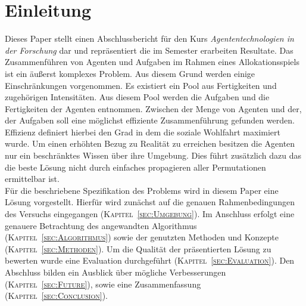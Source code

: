 \documentclass[fleqn,10pt]{SelfArx} %
\newcommand{\ChapterCite}[1]{\textsc{Kapitel~\ref{#1}}}
\begin{document}
\flushbottom %

\maketitle %

\tableofcontents %

\thispagestyle{empty} %


\section*{Einleitung} %
\label{sec:einleitung}


Dieses Paper stellt einen Abschlussbericht für den Kurs \textit{Agententechnologien in der Forschung} dar und repräsentiert die im Semester erarbeiten Resultate. Das Zusammenführen von Agenten und Aufgaben im Rahmen eines Allokationsspiels ist ein äußerst komplexes Problem. Aus diesem Grund werden einige Einschränkungen vorgenommen. Es existiert ein Pool aus Fertigkeiten und zugehörigen Intensitäten. Aus diesem Pool werden die Aufgaben und die Fertigkeiten der Agenten entnommen. Zwischen der Menge von Agenten und der, der Aufgaben soll eine möglichst effiziente Zusammenführung gefunden werden. Effizienz definiert hierbei den Grad in dem die soziale Wohlfahrt maximiert wurde. Um einen erhöhten Bezug zu Realität zu erreichen besitzen die Agenten nur ein beschränktes Wissen über ihre Umgebung. Dies führt zusätzlich dazu das die beste Lösung nicht durch einfaches propagieren aller Permutationen ermittelbar ist. \\
Für die beschriebene Spezifikation des Problems wird in diesem Paper eine Lösung vorgestellt. Hierfür wird zunächst auf die genauen Rahmenbedingungen des Versuchs eingegangen (\ChapterCite{sec:Umgebung}). Im Anschluss erfolgt eine genauere Betrachtung des angewandten Algorithmus (\ChapterCite{sec:Algorithmus}) sowie der genutzten Methoden und Konzepte (\ChapterCite{sec:Methoden}). Um die Qualität der präsentierten Lösung zu bewerten wurde eine Evaluation durchgeführt (\ChapterCite{sec:Evaluation}). Den Abschluss bilden ein Ausblick über mögliche Verbesserungen (\ChapterCite{sec:Future}), sowie eine Zusammenfassung (\ChapterCite{sec:Conclusion}). 
\end{document}
